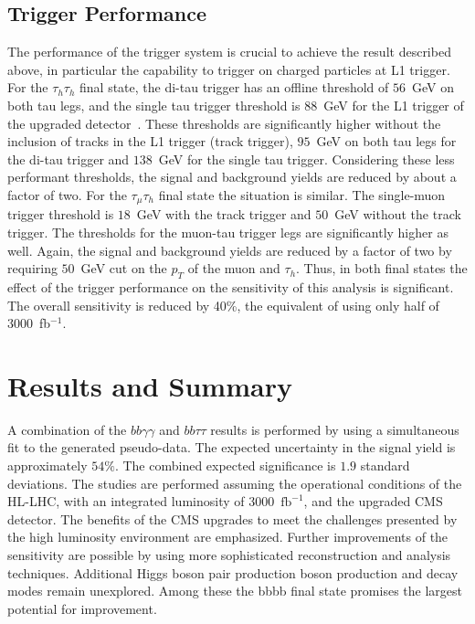 \subsection{Trigger Performance}
The performance of the trigger system is crucial to achieve the result
described above, in particular the capability to trigger on charged
particles at L1 trigger. For the $\tau_{h}\tau_{h}$ final state, the
di-tau trigger has an offline threshold of $56$~GeV on both tau legs,
and the single tau trigger threshold is $88$~GeV for the L1 trigger  of the \phasetwo upgraded detector~\cite{Butler:2020886}.  These thresholds are significantly higher without the inclusion of tracks in the L1 trigger (track trigger), $95$~GeV on both tau legs for the di-tau trigger and $138$~GeV for the single tau trigger. Considering these less performant thresholds, the signal and background yields are reduced by about a factor of
two. For the $\tau_{\mu}\tau_{h}$ final state the situation is similar. The single-muon trigger
threshold is $18$~GeV with the track trigger and $50$~GeV without the track
trigger. The thresholds for the muon-tau trigger legs are significantly
higher as well. Again, the signal and background yields are reduced by a factor of two
by requiring $50$~GeV cut on the $p_T$ of the muon and $\tau_h$.
Thus, in both final states the effect of the trigger performance on the sensitivity of this analysis is significant. The overall sensitivity is
reduced by 40\%, the equivalent of  using only half of 3000~fb$^{-1}$.

\section{Results and Summary}
A combination of the  $bb\gamma\gamma$ and $bb\tau\tau$ results is performed by using a simultaneous fit to the generated pseudo-data. The expected uncertainty in the signal yield is approximately $54\%$. The combined expected significance is $1.9$ standard deviations. The studies are performed assuming the operational conditions of the HL-LHC, with an integrated luminosity of 3000~$\mathrm{fb}^{-1}$, and the upgraded CMS detector.  The benefits of the CMS \phasetwo upgrades to meet the challenges presented by the high luminosity environment are emphasized. Further improvements of the sensitivity are possible by using more sophisticated reconstruction and analysis techniques. Additional Higgs boson pair production boson production and decay modes remain unexplored. Among these the bbbb final state promises the largest potential for improvement.
